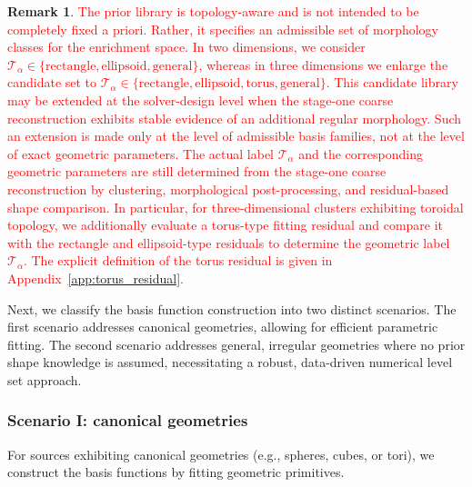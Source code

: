 \documentclass{article}
\newcommand{\red}[1]{\textcolor{red}{#1}}
\theoremstyle{plain}
\theoremstyle{definition}
\newtheorem{remark}{\textbf{Remark}}
\begin{document}
  \begin{remark}
  \red{
  The prior library is topology-aware and is not intended to be completely fixed a priori. Rather, it specifies an admissible set of morphology classes for the enrichment space. In two dimensions, we consider $\mathcal{T}_{\alpha}\in\{\mathrm{rectangle},\mathrm{ellipsoid},\mathrm{general}\}$, whereas in three dimensions we enlarge the candidate set to
 $\mathcal{T}_{\alpha}\in\{\mathrm{rectangle},\mathrm{ellipsoid},\mathrm{torus},\mathrm{general}\}$.
  This candidate library may be extended at the solver-design level when the stage-one coarse reconstruction exhibits stable evidence of an additional regular morphology. Such an extension is made only at the level of admissible basis families, not at the level
  of exact geometric parameters. The actual label $\mathcal{T}_{\alpha}$ and the corresponding geometric parameters are still determined from the stage-one coarse reconstruction by clustering, morphological post-processing, and residual-based shape comparison.
  In particular, for three-dimensional clusters exhibiting toroidal topology, we additionally evaluate a torus-type fitting residual and compare it with the rectangle and ellipsoid-type residuals to determine the geometric label $\mathcal{T}_{\alpha}$. The
  explicit definition of the torus residual is given in Appendix~\ref{app:torus_residual}.}
  \end{remark}
  
 {Next, we classify the basis function construction into two distinct scenarios.
The first scenario addresses canonical geometries, allowing for efficient parametric fitting. The second scenario addresses general, irregular geometries where no prior shape knowledge is assumed, necessitating a robust, data-driven numerical level set approach.}

\subsubsection{ {Scenario I: canonical geometries}}
 {For sources exhibiting canonical geometries (e.g., spheres, cubes, or tori), we construct the basis functions by fitting geometric primitives.}
\end{document}

